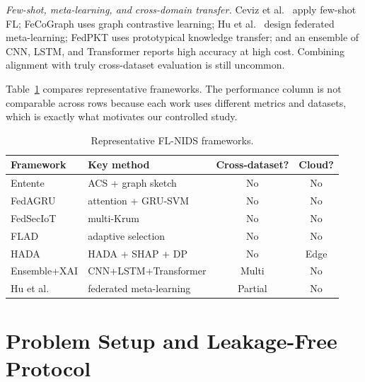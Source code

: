\documentclass[conference,onecolumn]{IEEEtran}
\begin{document}
\textit{Few-shot, meta-learning, and cross-domain transfer.} Ceviz et al.\ \cite{b10} apply few-shot
FL; FeCoGraph \cite{b28} uses graph contrastive learning; Hu et al.\ \cite{b9} design federated
meta-learning; FedPKT \cite{b29} uses prototypical knowledge transfer; and an ensemble of CNN, LSTM,
and Transformer \cite{b30} reports high accuracy at high cost. Combining alignment with truly
cross-dataset evaluation is still uncommon.

Table~\ref{tab:sota} compares representative frameworks. The performance column is not comparable
across rows because each work uses different metrics and datasets, which is exactly what motivates our
controlled study.

\begin{table}[htbp]
\caption{Representative FL-NIDS frameworks.}
\label{tab:sota}
\begin{center}
\footnotesize
\begin{tabular}{|l|l|c|c|}
\hline
\textbf{Framework} & \textbf{Key method} & \textbf{Cross-dataset?} & \textbf{Cloud?} \\
\hline
Entente \cite{b11} & ACS + graph sketch & No & No \\
FedAGRU \cite{b12} & attention + GRU-SVM & No & No \\
FedSecIoT \cite{b23} & multi-Krum & No & No \\
FLAD \cite{b14} & adaptive selection & No & No \\
HADA \cite{b22} & HADA + SHAP + DP & No & Edge \\
Ensemble+XAI \cite{b30} & CNN+LSTM+Transformer & Multi & No \\
Hu et al.\ \cite{b9} & federated meta-learning & Partial & No \\
\hline
\end{tabular}
\end{center}
\end{table}

\section{Problem Setup and Leakage-Free Protocol}
\label{sec:setup}
\end{document}
